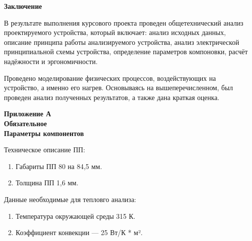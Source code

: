 \begin{center}
\textbf{Заключение}
\end{center}

В результате выполнения курсового проекта проведен общетехнический
анализ проектируемого устройства, который включает: анализ исходных
данных, описание принципа работы анализируемого устройства, анализ
электрической принципиальной схемы устройства,
определение параметров компоновки, расчёт надёжности и эргономичности.

Проведено моделирование физических процессов, воздействующих на
устройство, а именно его нагрев.
Основываясь на вышеперечисленном, был проведен анализ полученных
результатов, а также дана краткая оценка.

\newpage
\begin{center}
\textbf{Приложение А}\\
\textbf{Обязательное}\\
\textbf{Параметры компонентов}
\end{center}

Техническое описание ПП:
\begin{enumerate}[label={\arabic*.}]
\item Габариты ПП 80 на 84,5 мм.
\item Толщина ПП 1,6 мм.
\end{enumerate}

Данные необходимые для тепловго анализа:
\begin{enumerate}[label={\arabic*.}]
\item Температура окружающей среды 315 К.
\item Коэффициент конвекции — 25 Вт/К * м².
\end{enumerate}



